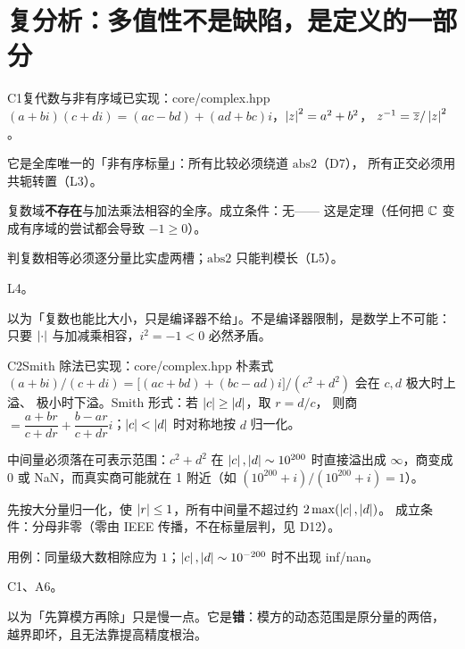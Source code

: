 \section{复分析：多值性不是缺陷，是定义的一部分}

\begin{know}{C1}{复代数与非有序域}{已实现：core/complex.hpp}
 $(a+bi)(c+di)=(ac-bd)+(ad+bc)i$，$\left\lvert z\right\rvert^{2}=a^{2}+b^{2}$，
$z^{-1}=\overline{z}/\left\lvert z\right\rvert^{2}$。

 它是全库唯一的「非有序标量」：所有比较必须绕道 $\mathrm{abs2}$（D7），
所有正交必须用共轭转置（L3）。

 复数域\textbf{不存在}与加法乘法相容的全序。成立条件：无——
这是定理（任何把 $\mathbb{C}$ 变成有序域的尝试都会导致 $-1\ge0$）。

 判复数相等必须逐分量比实虚两槽；$\mathrm{abs2}$ 只能判模长（L5）。

 L4。

 以为「复数也能比大小，只是编译器不给」。不是编译器限制，是数学上不可能：
只要 $\left\lvert \cdot\right\rvert$ 与加减乘相容，$i^{2}=-1<0$ 必然矛盾。
\end{know}

\begin{know}{C2}{Smith 除法}{已实现：core/complex.hpp}
 朴素式 $(a+bi)/(c+di)=\big[(ac+bd)+(bc-ad)i\big]/(c^{2}+d^{2})$ 会在 $c,d$ 极大时上溢、
极小时下溢。Smith 形式：若 $\left\lvert c\right\rvert\ge\left\lvert d\right\rvert$，取 $r=d/c$，
则商 $=\dfrac{a+br}{c+dr}+\dfrac{b-ar}{c+dr}i$；$\left\lvert c\right\rvert<\left\lvert d\right\rvert$ 时对称地按 $d$ 归一化。

 中间量必须落在可表示范围：$c^{2}+d^{2}$ 在 $\left\lvert c\right\rvert,\left\lvert d\right\rvert\sim10^{200}$ 时直接溢出成
$\infty$，商变成 $0$ 或 NaN，而真实商可能就在 1 附近（如 $(10^{200}+i)/(10^{200}+i)=1$）。

 先按大分量归一化，使 $\left\lvert r\right\rvert\le1$，所有中间量不超过约 $2\max(\left\lvert c\right\rvert,\left\lvert d\right\rvert)$。
成立条件：分母非零（零由 IEEE 传播，不在标量层判，见 D12）。

 用例：同量级大数相除应为 $1$；$\left\lvert c\right\rvert,\left\lvert d\right\rvert\sim10^{-200}$ 时不出现 inf/nan。

 C1、A6。

 以为「先算模方再除」只是慢一点。它是\textbf{错}：模方的动态范围是原分量的两倍，
越界即坏，且无法靠提高精度根治。
\end{know}

